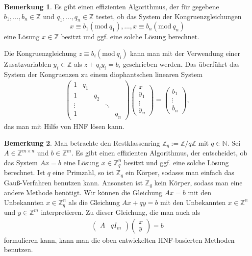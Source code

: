 \documentclass[
a4paper,landscape,16pt,
bibliography=totocnumbered,
numbers=noenddot,
]{scrartcl}
\numberwithin{equation}{subsection}
\newcommand{\N}{\mathbb N}
\newcommand{\Z}{\mathbb Z}
\theoremstyle{plain}
\theoremstyle{definition}
\newtheorem*{bem}{Bemerkung}
\begin{document}
\begin{bem}
	Es gibt einen effizienten Algorithmus, der für gegebene $b_1,\ldots,b_n \in \Z$ und $q_1,\ldots,q_n \in \Z$ testet, ob das System der Kongruenzgleichungen 
	\[	
		x \equiv b_1 (\mathrm{mod} \ q_1), \ldots, x \equiv b_n (\mathrm{mod} \ q_n)
	\]
	eine Lösung $x \in \Z$ besitzt und ggf. eine solche Lösung berechnet. 

	Die Kongruenzgleichung $z \equiv b_i (\mathrm{mod} \ q_i)$ kann man mit der Verwendung einer Zusatzvariablen $y_i \in \Z$ als $z + q_i y_i = b_i$ geschrieben werden. Das überführt das System der Kongruenzen zu einem diophantschen linearen System 
	\begin{align*}
			\begin{pmatrix} 1 & q_1 &  &
			\\ 1 & & q_2 & 
			\\ \vdots & & & \ddots 
			\\ 1 & & & & q_n 
			\end{pmatrix} 
			\begin{pmatrix} x \\ y_1 \\ \vdots \\ y_n \end{pmatrix} 
			= 
			\begin{pmatrix} b_1 \\ \vdots \\ b_n \end{pmatrix},  
	\end{align*}
	das man mit Hilfe von HNF lösen kann. 
\end{bem} 

\begin{bem}
	Man betrachte den Restklassenring $ \Z_q  := \Z/ q \Z$ mit $q \in \N$. Sei $A \in \Z^{m \times n}$ und $b \in \Z^m$. Es gibt einen effizienten Algorithmus, der entscheidet, ob das System $A x = b$ eine Lösung $x \in \Z_q^n$ besitzt und ggf. eine solche Lösung berechnet. Ist $q$ eine Primzahl, so ist $\Z_q$ ein Körper, sodasss man einfach das Gauß-Verfahren benutzen kann. Ansonsten ist $\Z_q$ kein Körper, sodass man eine andere Methode benötigt. Wir können die Gleichung $A x = b$ mit den Unbekannten $x \in \Z_q^n$ als die Gleichung $A x + q y = b$ mit den Unbekannten $x \in \Z^n$ und $y \in \Z^m$ interpretieren. Zu dieser Gleichung, die man auch als
	\begin{align*}
			\begin{pmatrix} A & q I_m \end{pmatrix} \begin{pmatrix} x \\ y  \end{pmatrix}  = b
	\end{align*}
	formulieren kann, kann man die oben entwickelten HNF-basierten Methoden benutzen. 
\end{bem} 
\end{document}
